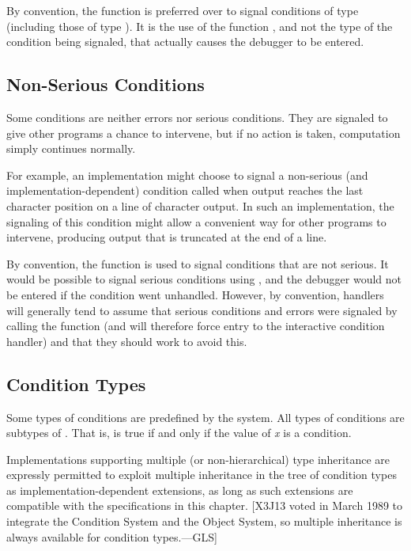 By convention, the function  is preferred over  to signal conditions
of type  (including those of type ). It is the use of
the function , and not the type of the condition being signaled, that
actually causes the debugger to be entered.

\subsection{Non-Serious Conditions}

Some conditions are neither errors nor serious conditions. They are signaled
to give other programs a chance to intervene, but if no action is taken,
computation simply continues normally.

For example, an implementation might choose to signal a non-serious (and
implementation-dependent) condition
called  when output reaches the last character position on a line
of character output. In such an implementation, the signaling of this
condition might allow a convenient way for other programs to intervene,
producing output that is truncated at the end of a line.

By convention, the function  is used to signal conditions that are not
serious. It would be possible to signal serious conditions using , and
the debugger would not be entered if the condition went unhandled.  However,
by convention,
handlers will generally tend to assume that serious conditions and errors
were signaled by calling the  function (and will therefore
force entry to the interactive condition handler) and that they should
work to avoid this.

\subsection{Condition Types}
 
Some types of conditions are predefined by the system. All types of conditions
are subtypes of . That is,  is true if
and only if the value of \emph{x} is a condition. 

Implementations supporting multiple (or non-hierarchical) type inheritance
are expressly permitted to exploit multiple inheritance in the tree of
condition types as implementation-dependent extensions, as long as such
extensions are compatible with the specifications in this chapter.
[X3J13 voted in March 1989 
to integrate the Condition System and the Object System,
so multiple inheritance is always available for condition types.---GLS]

